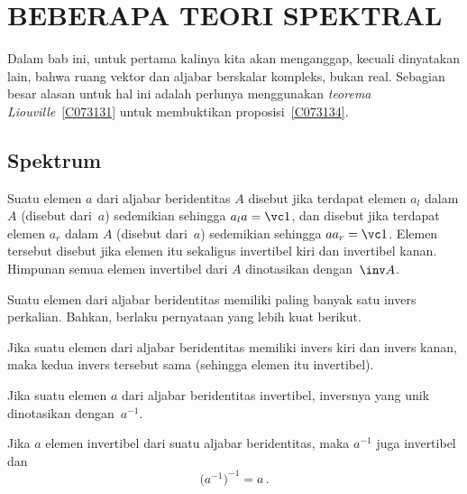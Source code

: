\chapter{BEBERAPA TEORI SPEKTRAL}\label{spectrum}

Dalam bab ini, untuk pertama kalinya kita akan menganggap, kecuali dinyatakan lain, bahwa ruang
vektor dan aljabar berskalar kompleks, bukan real. Sebagian besar alasan untuk hal ini
adalah perlunya menggunakan \emph{teorema Liouville}~\ref{C073131} untuk membuktikan
proposisi~\ref{C073134}.

\section{Spektrum}

\begin{defn} Suatu elemen $a$ dari aljabar beridentitas $A$ disebut
 jika terdapat elemen $a_l$ dalam $A$ (disebut 
dari~$a$) sedemikian sehingga $a_l a = \vc 1$, dan disebut
 jika terdapat elemen $a_r$ dalam $A$ (disebut  dari~$a$) sedemikian sehingga $aa_r = \vc 1$. Elemen tersebut disebut
 jika elemen itu sekaligus invertibel kiri dan invertibel kanan. Himpunan semua
elemen invertibel dari $A$ dinotasikan
dengan~$\inv A$.
\end{defn}

Suatu elemen dari aljabar beridentitas memiliki paling banyak satu invers perkalian. Bahkan,
berlaku pernyataan yang lebih kuat berikut.

\begin{prop}\label{000521} Jika suatu elemen dari aljabar beridentitas memiliki invers kiri dan
invers kanan, maka kedua invers tersebut sama (sehingga elemen itu invertibel).
\end{prop}

Jika suatu elemen $a$ dari aljabar beridentitas invertibel, inversnya yang unik dinotasikan
dengan~$a^{-1}$.

\begin{prop} Jika $a$ elemen invertibel dari suatu aljabar beridentitas, maka $a^{-1}$ juga
invertibel dan
   \[ \bigl(a^{-1}\bigr)^{-1} = a\,. \]
\end{prop}

